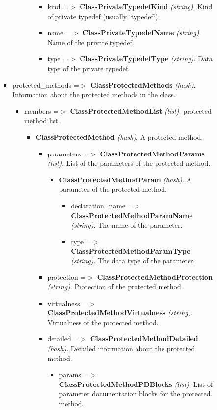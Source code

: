 \begin{itemize}
\begin{itemize}
\begin{itemize}
\begin{itemize}
\begin{itemize}
\begin{itemize}
\begin{itemize}
\item kind =$>$ {\bf ClassPrivateTypedefKind} {\em (string)\/}. Kind of private typedef (usually \char`\"{}typedef\char`\"{}). \item name =$>$ {\bf ClassPrivateTypedefName} {\em (string)\/}. Name of the private typedef. \item type =$>$ {\bf ClassPrivateTypedefType} {\em (string)\/}. Data type of the private typedef. \end{itemize}
\end{itemize}
\end{itemize}
\item protected\_\-methods =$>$ {\bf ClassProtectedMethods} {\em (hash)\/}. Information about the protected methods in the class. \begin{itemize}
\item members =$>$ {\bf ClassProtectedMethodList} {\em (list)\/}. protected method list. \begin{itemize}
\item {\bf ClassProtectedMethod} {\em (hash)\/}. A protected method. \begin{itemize}
\item parameters =$>$ {\bf ClassProtectedMethodParams} {\em (list)\/}. List of the parameters of the protected method. \begin{itemize}
\item {\bf ClassProtectedMethodParam} {\em (hash)\/}. A parameter of the protected method. \begin{itemize}
\item declaration\_\-name =$>$ {\bf ClassProtectedMethodParamName} {\em (string)\/}. The name of the parameter. \item type =$>$ {\bf ClassProtectedMethodParamType} {\em (string)\/}. The data type of the parameter. \end{itemize}
\end{itemize}
\item protection =$>$ {\bf ClassProtectedMethodProtection} {\em (string)\/}. Protection of the protected method. \item virtualness =$>$ {\bf ClassProtectedMethodVirtualness} {\em (string)\/}. Virtualness of the protected method. \item detailed =$>$ {\bf ClassProtectedMethodDetailed} {\em (hash)\/}. Detailed information about the protected method. \begin{itemize}
\item params =$>$ {\bf ClassProtectedMethodPDBlocks} {\em (list)\/}. List of parameter documentation blocks for the protected method. \begin{itemize}

\end{itemize}
\end{itemize}
\end{itemize}
\end{itemize}
\end{itemize}
\end{itemize}
\end{itemize}
\end{itemize}
\end{itemize}
